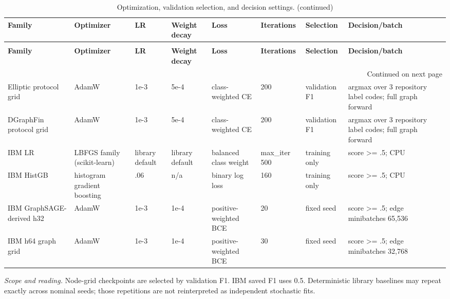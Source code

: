 \begingroup
\footnotesize
\setlength{\tabcolsep}{3pt}
\renewcommand{\arraystretch}{1.10}
\begin{longtable}{@{}p{} p{} p{} p{} p{} p{} p{} p{}@{}}
\caption{Optimization, validation selection, and decision settings.}\label{tab:s-training-cards}\\
\toprule
\textbf{Family} & \textbf{Optimizer} & \textbf{LR} & \textbf{Weight decay} & \textbf{Loss} & \textbf{Iterations} & \textbf{Selection} & \textbf{Decision/batch} \\
\midrule
\endfirsthead
\caption[]{Optimization, validation selection, and decision settings. (continued)}\\
\toprule
\textbf{Family} & \textbf{Optimizer} & \textbf{LR} & \textbf{Weight decay} & \textbf{Loss} & \textbf{Iterations} & \textbf{Selection} & \textbf{Decision/batch} \\
\midrule
\endhead
\midrule
\multicolumn{8}{r}{\footnotesize Continued on next page}\\
\endfoot
\bottomrule
\endlastfoot
Elliptic protocol grid & AdamW & 1e-3 & 5e-4 & class-weighted CE & 200 & validation F1 & argmax over 3 repository label codes; full graph forward \\
DGraphFin protocol grid & AdamW & 1e-3 & 5e-4 & class-weighted CE & 200 & validation F1 & argmax over 3 repository label codes; full graph forward \\
IBM LR & LBFGS family (scikit-learn) & library default & library default & balanced class weight & max\_iter 500 & training only & score >= .5; CPU \\
IBM HistGB & histogram gradient boosting & .06 & n/a & binary log loss & 160 & training only & score >= .5; CPU \\
IBM GraphSAGE-derived h32 & AdamW & 1e-3 & 1e-4 & positive-weighted BCE & 20 & fixed seed & score >= .5; edge minibatches 65,536 \\
IBM h64 graph grid & AdamW & 1e-3 & 1e-4 & positive-weighted BCE & 30 & fixed seed & score >= .5; edge minibatches 32,768 \\
\end{longtable}
\noindent\footnotesize\emph{Scope and reading.} Node-grid checkpoints are selected by validation F1. IBM saved F1 uses 0.5. Deterministic library baselines may repeat exactly across nominal seeds; those repetitions are not reinterpreted as independent stochastic fits.\par
\endgroup
